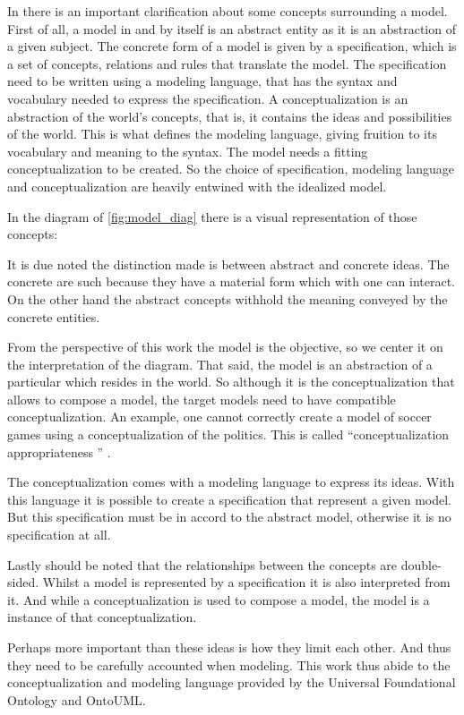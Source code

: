 In \cite{guizzardi_ontological_2005} there is an important clarification about some concepts surrounding a model. First of all, a model in and by itself is an abstract entity as it is an abstraction of a given subject. The concrete form of a model is given by a specification, which is a set of concepts, relations and rules that translate the model. The specification need to be written using a modeling language, that has the syntax and vocabulary needed to express the specification. A conceptualization is an abstraction of the world's concepts, that is, it contains the ideas and possibilities of the world. This is what defines the modeling language, giving fruition to its vocabulary and meaning to the syntax. The model needs a fitting conceptualization to be created. So the choice of specification, modeling language and conceptualization are heavily entwined with the idealized model.

In the diagram of \autoref{fig:model_diag} there is a visual representation of those concepts:



It is due noted the distinction made is between abstract and concrete ideas. The concrete are such because they have a material form which with one can interact. On the other hand the abstract concepts withhold the meaning conveyed by the concrete entities.

From the perspective of this work the model is the objective, so we center it on the interpretation of the diagram. That said, the model is an abstraction of a particular which resides in the world. So although it is the conceptualization that allows to compose a model, the target models need to have compatible conceptualization. An example, one cannot correctly create a model of soccer games using a conceptualization of the politics. This is called ``conceptualization appropriateness '' \cite{guizzardi_ontological_2005}.

The conceptualization comes with a modeling language to express its ideas. With this language it is possible to create a specification that represent a given model. But this specification must be in accord to the abstract model, otherwise it is no specification at all. 

Lastly should be noted that the relationships between the concepts are double-sided. Whilst a model is represented by a specification it is also interpreted from it. And while a conceptualization is used to compose a model, the model is a instance of that conceptualization.

Perhaps more important than these ideas is how they limit each other. And thus they need to be carefully accounted when modeling. This work thus abide to the conceptualization and modeling language provided by the Universal Foundational Ontology and OntoUML.